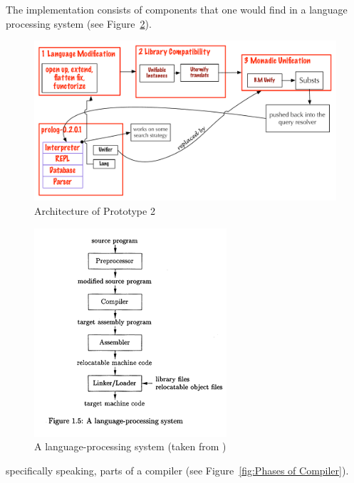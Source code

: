 \documentclass[thesis-solanki.tex]{subfiles}
\begin{document}
The implementation consists of components that one would find in a language processing system (see
Figure~\ref{fig:A language-processing system}).

\begin{figure}
  \includegraphics[width=1\textwidth]{Prototype-2-diagram.pdf}
\vspace*{-1cm}
  \caption{Architecture of Prototype 2}
  \label{fig:architecture-proto-2}
\end{figure}

\begin{figure}[th]
\centering
\includegraphics[scale = .95]{Language_Processing_System.png}
\caption{A language-processing system (taken from \cite{Aho:1986:CPT:6448})}
\label{fig:A language-processing system}
\end{figure}

specifically speaking, parts of a compiler (see Figure~\ref{fig:Phases of Compiler}).
\end{document}
